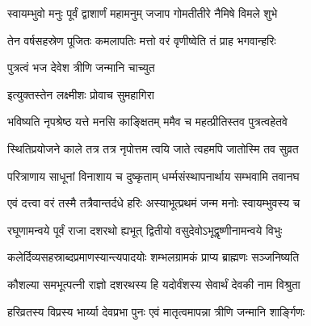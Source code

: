 

\storymeta



\twolineshloka
{स्वायम्भुवो मनुः पूर्वं द्वाशार्णं महामनुम्}
{जजाप गोमतीतीरे नैमिषे विमले शुभे}%

\twolineshloka
{तेन वर्षसहस्रेण पूजितः कमलापतिः}
{मत्तो वरं वृणीष्वेति तं प्राह भगवान्हरिः}%


\onelineshloka
{पुत्रत्वं भज देवेश त्रीणि जन्मानि चाच्युत}%


\onelineshloka
{इत्युक्तस्तेन लक्ष्मीशः प्रोवाच सुमहागिरा}%


\twolineshloka
{भविष्यति नृपश्रेष्ठ यत्ते मनसि काङ्क्षितम्}
{ममैव च महत्प्रीतिस्तव पुत्रत्वहेतवे}%

\twolineshloka
{स्थितिप्रयोजने काले तत्र तत्र नृपोत्तम}
{त्वयि जाते त्वहमपि जातोस्मि तव सुव्रत}%

\twolineshloka
{परित्राणाय साधूनां विनाशाय च दुष्कृताम्}
{धर्म्मसंस्थापनार्थाय सम्भवामि तवानघ}%


\twolineshloka
{एवं दत्त्वा वरं तस्मै तत्रैवान्तर्दधे हरिः}
{अस्याभूत्प्रथमं जन्म मनोः स्वायम्भुवस्य च}%

\twolineshloka
{रघूणामन्वये पूर्वं राजा दशरथो ह्यभूत्}
{द्वितीयो वसुदेवोऽभूद्वृष्णीनामन्वये विभुः}%

\twolineshloka
{कलेर्दिव्यसहस्राब्दप्रमाणस्यान्त्यपादयोः}
{शम्भलग्रामकं प्राप्य ब्राह्मणः सञ्जनिष्यति}%

\twolineshloka
{कौशल्या समभूत्पत्नी राज्ञो दशरथस्य हि}
{यदोर्वंशस्य सेवार्थं देवकी नाम विश्रुता}%

\twolineshloka
{हरिव्रतस्य विप्रस्य भार्य्या देवप्रभा पुनः}
{एवं मातृत्वमापन्ना त्रीणि जन्मानि शार्ङ्गिणः}%

